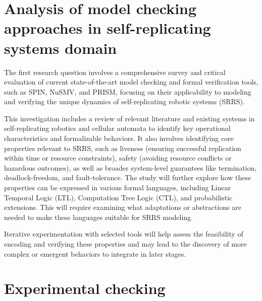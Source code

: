 \section{Analysis of model checking approaches in self-replicating systems domain}

%
%
The first research question involves a comprehensive survey and critical 
evaluation of current state-of-the-art model checking and formal verification 
tools, such as SPIN, NuSMV, and PRISM, focusing on their applicability to modeling 
and verifying the unique dynamics of self-replicating robotic systems (SRRS). 

This investigation includes a review of relevant literature and existing systems 
in self-replicating robotics and cellular automata to identify key operational 
characteristics and formalizable behaviors. It also involves identifying 
core properties relevant to SRRS, such as liveness (ensuring successful 
replication within time or resource constraints), safety (avoiding 
resource conflicts or hazardous outcomes), as well as broader system-level guarantees 
like termination, deadlock-freedom, and fault-tolerance. 
The study will further explore how these properties can be 
expressed in various formal languages, including Linear 
Temporal Logic (LTL), Computation Tree Logic (CTL), and probabilistic extensions. 
This will require examining what adaptations or abstractions are needed to 
make these languages suitable for SRRS modeling. 

Iterative experimentation with selected tools will help assess the feasibility 
of encoding and verifying these properties and may lead to the discovery 
of more complex or emergent behaviors to integrate in later stages.

\section{Experimental checking}



